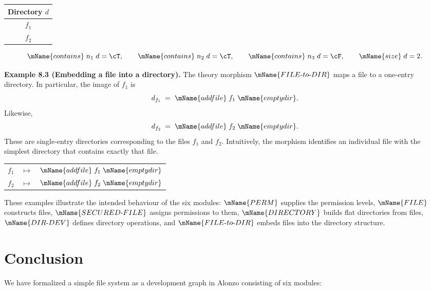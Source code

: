 \documentclass[11pt]{article}
\newcommand{\PERM}{\mName{PERM}}
\newcommand{\FILETYPE}{\mName{FILE}}
\newcommand{\SECFILE}{\mName{SECURED\text{-}FILE}}
\newcommand{\DIR}{\mName{DIRECTORY}}
\newcommand{\DIRDEV}{\mName{DIR\text{-}DEV}}
\begin{document}
\medskip
\begin{center}
\begin{tabular}{|c|}
\hline
\textbf{Directory $d$} \\
\hline
$f_1$ \\
$f_2$ \\
\hline
\end{tabular}
\end{center}

\[
  \mName{contains}\;n_1\;d = \cT,
  \qquad
  \mName{contains}\;n_2\;d = \cT,
  \qquad
  \mName{contains}\;n_3\;d = \cF,
  \qquad
  \mName{size}\;d = 2.
\]

\medskip
\noindent\textbf{Example 8.3 (Embedding a file into a directory).}
The theory morphism $\mName{FILE\text{-}to\text{-}DIR}$ maps a file
to a one-entry directory.  In particular, the image of $f_1$ is
\[
  d_{f_1} \;=\; \mName{addfile}\;f_1\;\mName{emptydir}.
\]
Likewise,
\[
  d_{f_2} \;=\; \mName{addfile}\;f_2\;\mName{emptydir}.
\]
These are single-entry directories corresponding to the files
$f_1$ and $f_2$.  Intuitively, the morphism identifies an
individual file with the simplest directory that contains exactly
that file.

\medskip
\begin{center}
\begin{tabular}{ccc}
$f_1$ & $\longmapsto$ & $\mName{addfile}\;f_1\;\mName{emptydir}$ \\[4pt]
$f_2$ & $\longmapsto$ & $\mName{addfile}\;f_2\;\mName{emptydir}$
\end{tabular}
\end{center}

These examples illustrate the intended behaviour of the six modules:
$\PERM$ supplies the permission levels, $\FILETYPE$ constructs files,
$\SECFILE$ assigns permissions to them, $\DIR$ builds flat
directories from files, $\DIRDEV$ defines directory operations, and
$\mName{FILE\text{-}to\text{-}DIR}$ embeds files into the directory
structure.

\section{Conclusion}
\label{sec:conclusion}

We have formalized a simple file system as a development graph in
Alonzo consisting of six modules:
\end{document}
